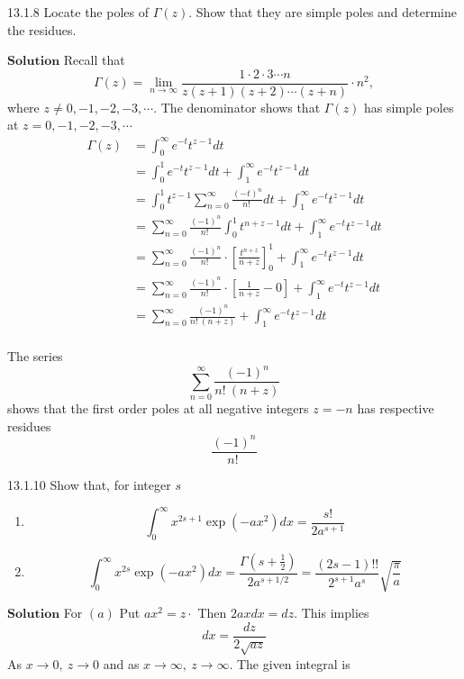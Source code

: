 \begin{mybox}{13.1.8}
Locate the poles of $\Gamma(z)$. Show that they are simple poles and determine the residues.
\end{mybox}
$\boxed{\textbf{Solution}}$
Recall that 
$$\Gamma(z)=\lim _{n \rightarrow \infty} \frac{1 \cdot 2 \cdot 3  \cdots  n}{z(z+1)(z+2) \cdots(z+n)} \cdot n^{2},$$ where $z \neq 0,-1,-2,-3, \cdots$. The denominator shows that $\Gamma(z)$ has simple poles at $z=0,-1,-2,-3, \cdots$
$$\begin{aligned}
\Gamma(z)&=\int_{0}^{\infty} e^{-t} t^{z-1} d t \\
&=\int_{0}^{1} e^{-t} t^{z-1} d t+\int_{1}^{\infty} e^{-t} t^{z-1} d t \\
&=\int_{0}^{1} t^{z-1} \sum_{n=0}^{\infty} \frac{(-t)^{n}}{n! \ } d t+\int_{1}^{\infty} e^{-t} t^{z-1} d t \\
&=\sum_{n=0}^{\infty} \frac{(-1)^{n}}{n! \ } \int_{0}^{1} t^{n+z-1} d t+\int_{1}^{\infty} e^{-t} t^{z-1} d t \\
&=\sum_{n=0}^{\infty} \frac{(-1)^{n}}{n! \ } \cdot\left[\frac{t^{n+z}}{n+z}\right]_{0}^{1}+\int_{1}^{\infty} e^{-t} t^{z-1} d t \\
&=\sum_{n=0}^{\infty} \frac{(-1)^{n}}{n! \ } \cdot\left[\frac{1}{n+z}-0\right]+\int_{1}^{\infty} e^{-t} t^{z-1} d t \\
&=\sum_{n=0}^{\infty} \frac{(-1)^{n}}{n! \ (n+z)}+\int_{1}^{\infty} e^{-t} t^{z-1} d t \\
\end{aligned}$$

The series 
$$\sum_{n=0}^{\infty} \frac{(-1)^{n}}{n! \ (n+z)}$$ 
shows that the first order poles at all negative integers $z=-n$ has respective residues 
$$\frac{(-1)^{n}}{n! \ }$$

\newpage

\begin{mybox}{13.1.10}
Show that, for integer $s$
\begin{enumerate}[$(a)$]
\item $$\int_{0}^{\infty} x^{2 s+1} \exp \left(-a x^{2}\right) d x=\frac{s!}{2 a^{s+1}}$$
\item $$\int_{0}^{\infty} x^{2 s} \exp \left(-a x^{2}\right) d x=\frac{\Gamma\left(s+\frac{1}{2}\right)}{2 a^{s+1 / 2}}=\frac{(2 s-1) ! !}{2^{s+1} a^{s}} \sqrt{\frac{\pi}{a}}$$
\end{enumerate}


\end{mybox}
$\boxed{\textbf{Solution}}$ For $(a)$ Put $a x^{2}=z \cdot$ Then $2 a x d x=d z$. This implies
$$
d x=\frac{d z}{2 \sqrt{a z}}
$$
As $x \rightarrow 0, \  z \rightarrow 0$ and as $x \rightarrow \infty, \  z \rightarrow \infty$.
The given integral is

